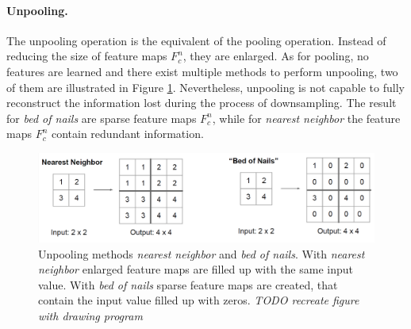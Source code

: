 \paragraph{Unpooling.}
The unpooling operation is the equivalent of the pooling operation.
Instead of reducing the size of feature maps $F^{n}_{c}$, they are enlarged.
As for pooling, no features are learned and there exist multiple methods to perform unpooling, two of them are illustrated in Figure \ref{fig:ch2:sec2:unpooling_1}.
Nevertheless, unpooling is not capable to fully reconstruct the information lost during the process of downsampling.
The result for \textit{bed of nails} are sparse feature maps $F^{n}_{c}$, while for \textit{nearest neighbor} the feature maps $F^{n}_{c}$ contain redundant information.

\begin{figure}
	\includegraphics[width=\linewidth]{figures/chap223_unpooling1.png}
	\caption[Unpooling methods \textit{nearest neighbor} and \textit{bed of nails}]{
		Unpooling methods \textit{nearest neighbor} and \textit{bed of nails}.
		With \textit{nearest neighbor} enlarged feature maps are filled up with the same input value. 
		With \textit{bed of nails} sparse feature maps are created, that contain the input value filled up with zeros.
		\textit{TODO recreate figure with drawing program}}	
	\label{fig:ch2:sec2:unpooling_1}
\end{figure}


